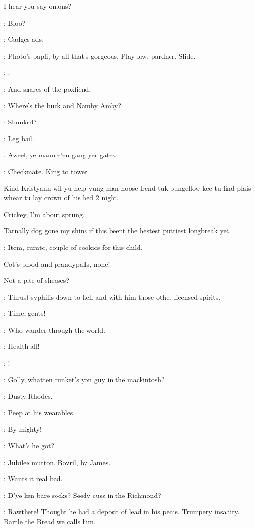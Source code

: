 I hear you say onions?

\bannon:
Bloo?

\dixon:
Cadges ads.

\bannon:
Photo's papli,
by all that's gorgeous.
Play low,
pardner.
Slide.

\mulligan:
.


\stephen:
And snares of the poxfiend.

\bantam:
Where's the buck and Namby Amby?

\stephen:
Skunked?

\lenehan:
Leg bail.

\crotthers:
Aweel,
ye maun e'en gang yer gates.

\stephen:
Checkmate.
King to tower.

Kind Kristyann wil yu help yung man hoose frend
tuk bungellow kee tu find plais whear tu lay crown of his hed 2 night.

Crickey,
I'm about sprung.

Tarnally dog gone my shins if this beent the
bestest puttiest longbreak yet.

\punch:
Item,
curate,
couple of cookies for this child.

Cot's plood and prandypalls,
none!

Not a pite of sheeses?

\stephen:
Thrust syphilis down to hell and with him those other licensed spirits.

\barman:
Time,
gents!

\stephen:
Who wander through the world.

\punch:
Health all!

\dixon:
!


\crotthers:
Golly,
whatten tunket's yon guy in the mackintosh?

\lenehan:
Dusty Rhodes.

\lynch:
Peep at his wearables.

\crotthers:
By mighty!

\stephen:
What's he got?

\dixon:
Jubilee mutton.
Bovril,
by James.

\lenehan:
Wants it real bad.

\crotthers:
D'ye ken bare socks?
Seedy cuss in the Richmond?

\dixon:
Rawthere!
Thought he had a deposit of lead in his penis.
Trumpery insanity.
Bartle the Bread we calls him.

